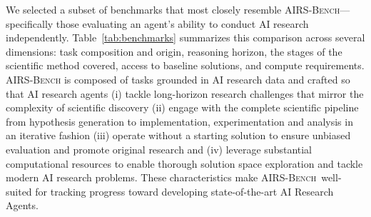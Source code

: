 \documentclass{fairmeta}
\newcommand{\bench}[1]{\textbf{#1}}
\newcommand{\airsbench}{\textsc{AIRS-Bench}}
\newcommand{\mlgym}{\textsc{MLGym}}
\begin{document}
We selected a subset of benchmarks that most closely resemble \airsbench—specifically those evaluating an agent's ability to conduct AI research independently. Table~\ref{tab:benchmarks} summarizes this comparison across several dimensions: task composition and origin, reasoning horizon, the stages of the scientific method covered, access to baseline solutions, and compute requirements. \airsbench{} is composed of tasks grounded in AI research data and crafted so that AI research agents (i) tackle long-horizon research challenges that mirror the complexity of scientific discovery (ii)  engage with the complete scientific pipeline from hypothesis generation to implementation, experimentation and analysis in an iterative fashion (iii) operate without a starting solution to ensure unbiased evaluation and promote original research and (iv) leverage substantial computational resources to enable thorough solution space exploration and tackle modern AI research problems. These characteristics make \airsbench~well-suited for tracking progress toward developing state-of-the-art AI Research Agents.








\end{document}
